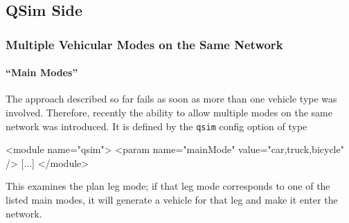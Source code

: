 \subsection{QSim Side}
\label{sec:using-qsim-multimodal}
\subsubsection{Multiple Vehicular Modes on the Same Network}


\paragraph{\enquote{Main Modes}}
The approach described so far fails as soon as more than one vehicle type was involved. Therefore, recently the ability to allow multiple modes on the same network was introduced.  
It is defined by the \lstinline{qsim} config option of type
\begin{xml}
<module name="qsim">
   <param name="mainMode" value="car,truck,bicycle" />
   [...]
</module>
\end{xml}
This examines the plan leg mode; if that leg mode corresponds to one of the listed main modes, it will generate a vehicle for that leg and make it enter the network.

